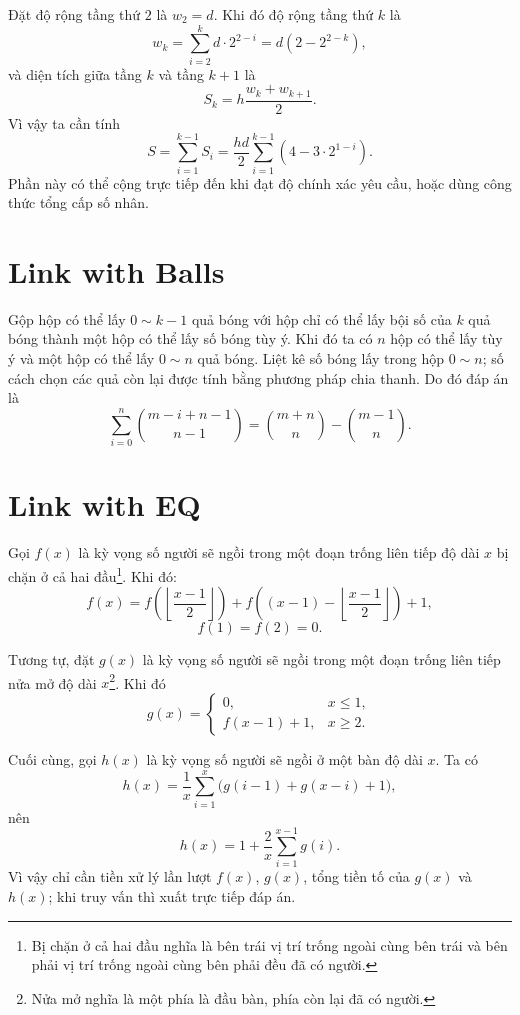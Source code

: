 \documentclass[11pt]{article}
\begin{document}
Đặt độ rộng tầng thứ $2$ là $w_2=d$. Khi đó độ rộng tầng thứ $k$ là
\[
  w_k=\sum_{i=2}^{k} d\cdot 2^{2-i}
      = d\left(2-2^{2-k}\right),
\]
và diện tích giữa tầng $k$ và tầng $k+1$ là
\[
  S_k=h\frac{w_k+w_{k+1}}{2}.
\]
Vì vậy ta cần tính
\[
  S=\sum_{i=1}^{k-1}S_i
   =\frac{hd}{2}\sum_{i=1}^{k-1}\left(4-3\cdot 2^{1-i}\right).
\]
Phần này có thể cộng trực tiếp đến khi đạt độ chính xác yêu cầu, hoặc dùng
công thức tổng cấp số nhân.

\section{Link with Balls}

Gộp hộp có thể lấy $0\sim k-1$ quả bóng với hộp chỉ có thể lấy bội số của $k$
quả bóng thành một hộp có thể lấy số bóng tùy ý. Khi đó ta có $n$ hộp có thể
lấy tùy ý và một hộp có thể lấy $0\sim n$ quả bóng. Liệt kê số bóng lấy trong
hộp $0\sim n$; số cách chọn các quả còn lại được tính bằng phương pháp chia
thanh. Do đó đáp án là
\[
  \sum_{i=0}^{n} \binom{m-i+n-1}{n-1}
  =
  \binom{m+n}{n}-\binom{m-1}{n}.
\]

\section{Link with EQ}

Gọi $f(x)$ là kỳ vọng số người sẽ ngồi trong một đoạn trống liên tiếp độ dài
$x$ bị chặn ở cả hai đầu\footnote{Bị chặn ở cả hai đầu nghĩa là bên trái vị
trí trống ngoài cùng bên trái và bên phải vị trí trống ngoài cùng bên phải đều
đã có người.}. Khi đó:
\[
  f(x)=
  f\!\left(\left\lfloor\frac{x-1}{2}\right\rfloor\right)
  +
  f\!\left((x-1)-\left\lfloor\frac{x-1}{2}\right\rfloor\right)
  +1,
\]
\[
  f(1)=f(2)=0.
\]

Tương tự, đặt $g(x)$ là kỳ vọng số người sẽ ngồi trong một đoạn trống liên
tiếp nửa mở độ dài $x$\footnote{Nửa mở nghĩa là một phía là đầu bàn, phía còn
lại đã có người.}. Khi đó
\[
  g(x)=
  \begin{cases}
    0, & x\le 1,\\
    f(x-1)+1, & x\ge 2.
  \end{cases}
\]

Cuối cùng, gọi $h(x)$ là kỳ vọng số người sẽ ngồi ở một bàn độ dài $x$. Ta có
\[
  h(x)=\frac{1}{x}\sum_{i=1}^{x}\bigl(g(i-1)+g(x-i)+1\bigr),
\]
nên
\[
  h(x)=1+\frac{2}{x}\sum_{i=1}^{x-1}g(i).
\]
Vì vậy chỉ cần tiền xử lý lần lượt $f(x)$, $g(x)$, tổng tiền tố của $g(x)$ và
$h(x)$; khi truy vấn thì xuất trực tiếp đáp án.
\end{document}

